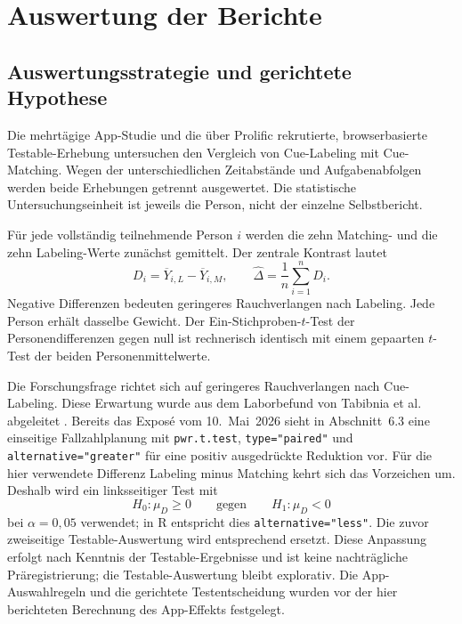 \chapter{Auswertung der Berichte}
\label{chap:auswertung}



\section{Auswertungsstrategie und gerichtete Hypothese}
Die mehrtägige App-Studie und die über Prolific rekrutierte, browserbasierte Testable-Erhebung untersuchen den Vergleich von Cue-Labeling mit Cue-Matching. Wegen der unterschiedlichen Zeitabstände und Aufgabenabfolgen werden beide Erhebungen getrennt ausgewertet. Die statistische Untersuchungseinheit ist jeweils die Person, nicht der einzelne Selbstbericht.

Für jede vollständig teilnehmende Person $i$ werden die zehn Matching- und die zehn Labeling-Werte zunächst gemittelt. Der zentrale Kontrast lautet
\begin{equation}
 D_i=\overline{Y}_{i,L}-\overline{Y}_{i,M},\qquad
 \widehat{\Delta}=\frac{1}{n}\sum_{i=1}^{n}D_i.
\end{equation}
Negative Differenzen bedeuten geringeres Rauchverlangen nach Labeling. Jede Person erhält dasselbe Gewicht. Der Ein-Stichproben-$t$-Test der Personendifferenzen gegen null ist rechnerisch identisch mit einem gepaarten $t$-Test der beiden Personenmittelwerte.

Die Forschungsfrage richtet sich auf geringeres Rauchverlangen nach Cue-Labeling. Diese Erwartung wurde aus dem Laborbefund von Tabibnia et al. abgeleitet \cite{tabibnia_cuelabeling_2026}. Bereits das Exposé vom 10.~Mai~2026 sieht in Abschnitt~6.3 eine einseitige Fallzahlplanung mit \texttt{pwr.t.test}, \texttt{type="paired"} und \texttt{alternative="greater"} für eine positiv ausgedrückte Reduktion vor. Für die hier verwendete Differenz Labeling minus Matching kehrt sich das Vorzeichen um. Deshalb wird ein linksseitiger Test mit
\begin{equation}
 H_0:\mu_D\geq 0\qquad\text{gegen}\qquad H_1:\mu_D<0
\end{equation}
bei $\alpha=0{,}05$ verwendet; in R entspricht dies \texttt{alternative="less"}. Die zuvor zweiseitige Testable-Auswertung wird entsprechend ersetzt. Diese Anpassung erfolgt nach Kenntnis der Testable-Ergebnisse und ist keine nachträgliche Präregistrierung; die Testable-Auswertung bleibt explorativ. Die App-Auswahlregeln und die gerichtete Testentscheidung wurden vor der hier berichteten Berechnung des App-Effekts festgelegt.

